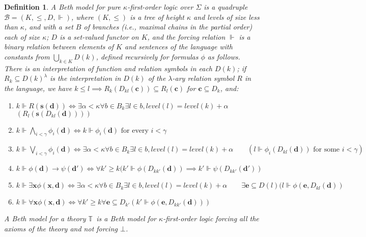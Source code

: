 \documentclass[a4paper,11pt]{article}
\theoremstyle{plain}
\theoremstyle{plain}
\newtheorem{defs}[thm]{Definition}
\theoremstyle{remark}
\newcommand{\theory}{\ensuremath{\mathbb{T}}}
\begin{document}
\begin{defs}\label{bethmodelt}
 A Beth model for pure $\kappa$-first-order logic over $\Sigma$ is a quadruple $\mathcal{B}=(K, \leq, D, \Vdash)$, where $(K, \leq)$ is a tree of height $\kappa$ and levels of size less than $\kappa$, and with a set $B$ of branches (i.e., maximal chains in the partial order) each of size $\kappa$; $D$ is a set-valued functor on $K$, and the forcing relation $\Vdash$ is a binary relation between elements of $K$ and sentences of the language with constants from $\bigcup_{k \in K}D(k)$, defined recursively for formulas $\phi$ as follows. There is an interpretation of function and relation symbols in each $D(k)$; if $R_k \subseteq D(k)^{\lambda}$ is the interpretation in $D(k)$ of the $\lambda$-ary relation symbol $R$ in the language, we have $k \leq l \implies R_k(D_{kl}(\mathbf{c})) \subseteq R_l(\mathbf{c})$ for $\mathbf{c} \subseteq D_k$, and: 
 
 \begin{enumerate}
  \item $k \Vdash R(\mathbf{s}(\mathbf{d})) \iff \exists \alpha<\kappa \forall b \in B_k \exists l \in b, level(l)=level(k)+\alpha$ $(R_l(\mathbf{s}(D_{kl}(\mathbf{d}))))$
  \item $k \Vdash \bigwedge_{i<\gamma}\phi_i(\mathbf{d}) \iff k \Vdash \phi_i(\mathbf{d}) \text{ for every } i<\gamma$
  \item $k \Vdash \bigvee_{i<\gamma}\phi_i(\mathbf{d}) \iff \exists \alpha<\kappa \forall b \in B_k \exists l \in b, level(l)=level(k)+\alpha \qquad (l \Vdash \phi_i(D_{kl}(\mathbf{d})) \text{ for some } i<\gamma)$
  \item $k \Vdash \phi(\mathbf{d}) \to \psi(\mathbf{d'}) \iff \forall k' \geq k (k' \Vdash \phi(D_{kk'}(\mathbf{d})) \implies k' \Vdash \psi(D_{kk'}(\mathbf{d'}))$
  \item $k \Vdash \exists \mathbf{x} \phi(\mathbf{x}, \mathbf{d}) \iff \exists \alpha<\kappa \forall b \in B_k \exists l \in b, level(l)=level(k)+\alpha \qquad \exists \mathbf{e} \subseteq D(l) (l \Vdash \phi(\mathbf{e}, D_{kl}(\mathbf{d}))$
  \item $k \Vdash \forall \mathbf{x} \phi(\mathbf{x}, \mathbf{d}) \iff \forall k' \geq k \forall \mathbf{e} \subseteq D_{k'} (k' \Vdash \phi(\mathbf{e}, D_{kk'}(\mathbf{d})))$
 \end{enumerate}

A Beth model for a theory \theory\ is a Beth model for $\kappa$-first-order logic forcing all the axioms of the theory and not forcing $\bot$. 
\end{defs}
\end{document}
